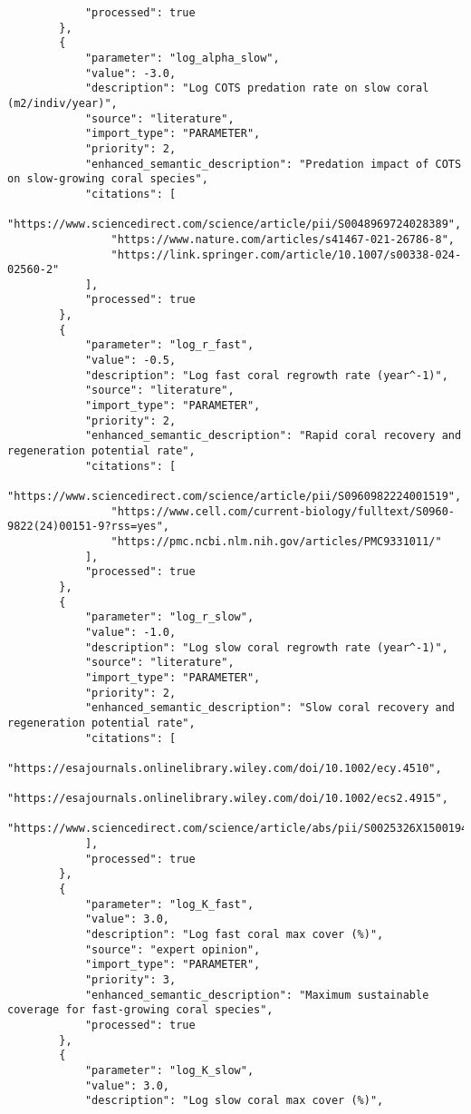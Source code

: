 \begin{lstlisting}
            "processed": true
        },
        {
            "parameter": "log_alpha_slow",
            "value": -3.0,
            "description": "Log COTS predation rate on slow coral (m2/indiv/year)",
            "source": "literature",
            "import_type": "PARAMETER",
            "priority": 2,
            "enhanced_semantic_description": "Predation impact of COTS on slow-growing coral species",
            "citations": [
                "https://www.sciencedirect.com/science/article/pii/S0048969724028389",
                "https://www.nature.com/articles/s41467-021-26786-8",
                "https://link.springer.com/article/10.1007/s00338-024-02560-2"
            ],
            "processed": true
        },
        {
            "parameter": "log_r_fast",
            "value": -0.5,
            "description": "Log fast coral regrowth rate (year^-1)",
            "source": "literature",
            "import_type": "PARAMETER",
            "priority": 2,
            "enhanced_semantic_description": "Rapid coral recovery and regeneration potential rate",
            "citations": [
                "https://www.sciencedirect.com/science/article/pii/S0960982224001519",
                "https://www.cell.com/current-biology/fulltext/S0960-9822(24)00151-9?rss=yes",
                "https://pmc.ncbi.nlm.nih.gov/articles/PMC9331011/"
            ],
            "processed": true
        },
        {
            "parameter": "log_r_slow",
            "value": -1.0,
            "description": "Log slow coral regrowth rate (year^-1)",
            "source": "literature",
            "import_type": "PARAMETER",
            "priority": 2,
            "enhanced_semantic_description": "Slow coral recovery and regeneration potential rate",
            "citations": [
                "https://esajournals.onlinelibrary.wiley.com/doi/10.1002/ecy.4510",
                "https://esajournals.onlinelibrary.wiley.com/doi/10.1002/ecs2.4915",
                "https://www.sciencedirect.com/science/article/abs/pii/S0025326X15001940"
            ],
            "processed": true
        },
        {
            "parameter": "log_K_fast",
            "value": 3.0,
            "description": "Log fast coral max cover (%)",
            "source": "expert opinion",
            "import_type": "PARAMETER",
            "priority": 3,
            "enhanced_semantic_description": "Maximum sustainable coverage for fast-growing coral species",
            "processed": true
        },
        {
            "parameter": "log_K_slow",
            "value": 3.0,
            "description": "Log slow coral max cover (%)",

\end{lstlisting}
